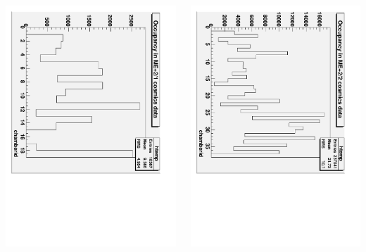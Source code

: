 \documentclass[compress]{beamer}
\begin{document}
\begin{frame}
\begin{columns}
\includegraphics[height=\linewidth, angle=90]{data_occupancy_ME21.pdf}

\includegraphics[height=\linewidth, angle=90]{data_occupancy_ME22.pdf}
\end{columns}
\end{frame}
\end{document}
